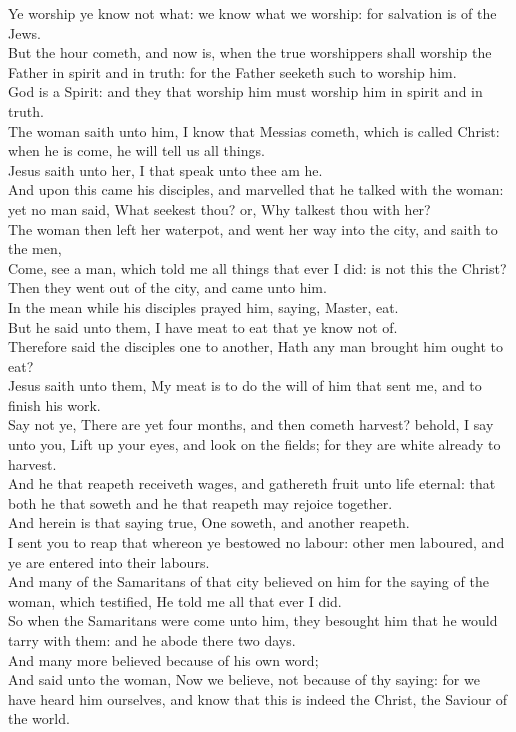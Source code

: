 \documentclass[10pt]{article} %
\begin{document}
{\begin{minipage}[t]{0.46\textwidth}
Ye worship ye know not what: we know what we worship: for salvation is of the Jews.\\
But the hour cometh, and now is, when the true worshippers shall worship the Father in spirit and in truth: for the Father seeketh such to worship him.\\
God is a Spirit: and they that worship him must worship him in spirit and in truth.\\
The woman saith unto him, I know that Messias cometh, which is called Christ: when he is come, he will tell us all things.\\
Jesus saith unto her, I that speak unto thee am he.\\
And upon this came his disciples, and marvelled that he talked with the woman: yet no man said, What seekest thou? or, Why talkest thou with her?\\
The woman then left her waterpot, and went her way into the city, and saith to the men,\\
Come, see a man, which told me all things that ever I did: is not this the Christ?\\
Then they went out of the city, and came unto him.\\
In the mean while his disciples prayed him, saying, Master, eat.\\
But he said unto them, I have meat to eat that ye know not of.\\
Therefore said the disciples one to another, Hath any man brought him ought to eat?\\
Jesus saith unto them, My meat is to do the will of him that sent me, and to finish his work.\\
Say not ye, There are yet four months, and then cometh harvest? behold, I say unto you, Lift up your eyes, and look on the fields; for they are white already to harvest.\\
And he that reapeth receiveth wages, and gathereth fruit unto life eternal: that both he that soweth and he that reapeth may rejoice together.\\
And herein is that saying true, One soweth, and another reapeth.\\
I sent you to reap that whereon ye bestowed no labour: other men laboured, and ye are entered into their labours.\\
And many of the Samaritans of that city believed on him for the saying of the woman, which testified, He told me all that ever I did.\\
So when the Samaritans were come unto him, they besought him that he would tarry with them: and he abode there two days.\\
And many more believed because of his own word;\\
And said unto the woman, Now we believe, not because of thy saying: for we have heard him ourselves, and know that this is indeed the Christ, the Saviour of the world.\\

\end{minipage}}
\end{document}
